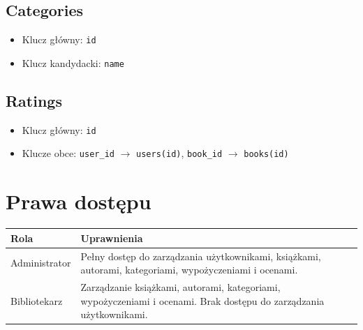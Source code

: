 \documentclass{article}
\begin{document}
\subsection*{Categories}
\begin{itemize}
    \item Klucz główny: \texttt{id}
    \item Klucz kandydacki: \texttt{name}
\end{itemize}

\subsection*{Ratings}
\begin{itemize}
    \item Klucz główny: \texttt{id}
    \item Klucze obce: \texttt{user\_id} \(\rightarrow\) \texttt{users(id)}, \texttt{book\_id} \(\rightarrow\) \texttt{books(id)}
\end{itemize}

\section*{Prawa dostępu}
\begin{longtable}{|l|p{10cm}|}
\hline
\textbf{Rola} & \textbf{Uprawnienia} \\
\hline
Administrator & Pełny dostęp do zarządzania użytkownikami, książkami, autorami, kategoriami, wypożyczeniami i ocenami. \\
\hline
Bibliotekarz & Zarządzanie książkami, autorami, kategoriami, wypożyczeniami i ocenami. Brak dostępu do zarządzania użytkownikami. \\
\hline
\end{longtable}
\end{document}
